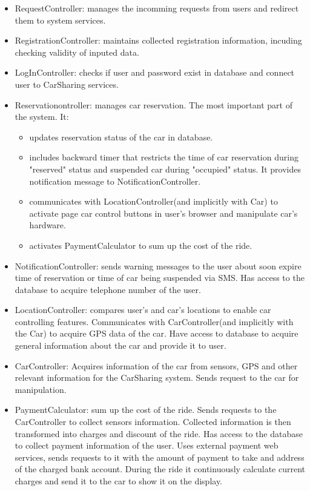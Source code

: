 \documentclass[12pt, letterpaper]{article}
\begin{document}
\begin{itemize}
	\item RequestController: manages the incomming requests from users and redirect them to system services.
	\item RegistrationController: maintains collected registration information, incuding checking validity of inputed data. 
	\item LogInController: checks if user and password exist in database and connect user to CarSharing services. 
	\item Reservationontroller: manages car reservation. The most important part of the system. It: 
	\begin{itemize}
	   	\item updates reservation status of the car in database.
	   	\item includes backward timer that restricts the time of car reservation during "reserved" status and suspended car during "occupied" status. It provides notification message to NotificationController.  
	   	\item communicates with LocationController(and implicitly with Car) to activate page car control buttons in user's browser and manipulate car's hardware.
	   	\item activates PaymentCalculator to sum up the cost of the ride. 
	\end{itemize}   
	\item NotificationController: sends warning messages to the user about soon expire time of reservation or time of car being suspended via SMS. Has access to the database to acquire telephone number of the user.
	\item LocationController: compares user's and car's locations to enable car controlling features. Communicates with CarController(and implicitly with the Car) to acquire GPS data of the car. Have access to database to acquire general information about the car and provide it to user.  
	\item CarController: Acquires information of the car from sensors, GPS and other relevant information for the CarSharing system. Sends request to the car for manipulation. 
	\item PaymentCalculator: sum up the cost of the ride. Sends requests to the CarController to collect sensors information. Collected information is then transformed into charges and discount of the ride. Has access to the database to collect payment information of the user. Uses external payment web services, sends requests to it with the amount of payment to take and address of the charged bank account. During the ride it continuously calculate current charges and send it to the car to show it on the display.
\end{itemize}
\end{document}
